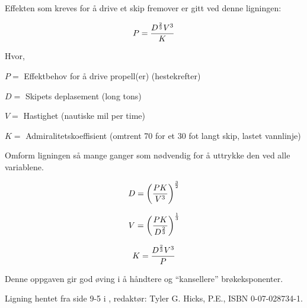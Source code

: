 

Effekten som kreves for å drive et skip fremover er gitt ved denne ligningen:

$$P = {D^{2 \over 3} V^3 \over K}$$

\noindent
Hvor,

$P =$ Effektbehov for å drive propell(er) (hestekrefter)

$D =$ Skipets deplasement (long tons)

$V =$ Hastighet (nautiske mil per time)

$K =$ Admiralitetskoeffisient (omtrent 70 for et 30 fot langt skip, lastet vannlinje)

\vskip 10pt

Omform ligningen så mange ganger som nødvendig for å uttrykke den ved alle variablene.







$$D = \biggl({P K \over V^3} \biggr)^{3 \over 2}$$

\vskip 20pt

$$V = \biggl({P K \over D^{2 \over 3}} \biggr)^{1 \over 3}$$

\vskip 20pt

$$K = {D^{2 \over 3} V^3 \over P}$$







Denne oppgaven gir god øving i å håndtere og ``kansellere'' brøkeksponenter.

\vskip 10pt

Ligning hentet fra side 9-5 i , redaktør: Tyler G. Hicks, P.E., ISBN 0-07-028734-1.



